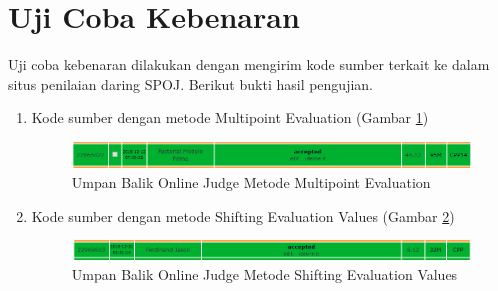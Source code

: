 \section{Uji Coba Kebenaran}
Uji coba kebenaran dilakukan dengan mengirim kode sumber terkait ke dalam situs penilaian daring SPOJ. Berikut bukti hasil pengujian.

\begin{enumerate}
\item Kode sumber dengan metode Multipoint Evaluation (Gambar \ref{fig:verdict_multi})
\begin{figure}[h!]
	\includegraphics[scale=0.41]{bab5/img/multi-verdict}
	\caption{Umpan Balik Online Judge Metode Multipoint Evaluation}
	\label{fig:verdict_multi}
\end{figure}
\item Kode sumber dengan metode Shifting Evaluation Values (Gambar \ref{fig:verdict_shift})
\begin{figure}[h!]
	\includegraphics[scale=0.41]{bab5/img/shifting-verdict}
	\caption{Umpan Balik Online Judge Metode Shifting Evaluation Values}
	\label{fig:verdict_shift}
\end{figure}
\end{enumerate}
